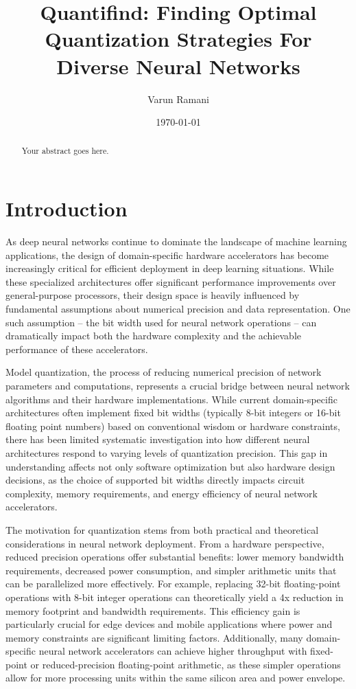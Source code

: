 \documentclass[twocolumn]{article}
\title{Quantifind: Finding Optimal Quantization Strategies For Diverse Neural Networks}
\author{Varun Ramani}
\date{\today}
\begin{document}
\maketitle

\begin{abstract}
Your abstract goes here.
\end{abstract}

\section{Introduction}
As deep neural networks continue to dominate the landscape of machine learning
applications, the design of domain-specific hardware accelerators has become
increasingly critical for efficient deployment in deep learning situations.
While these specialized architectures offer significant performance improvements
over general-purpose processors, their design space is heavily influenced by
fundamental assumptions about numerical precision and data representation. One
such assumption -- the bit width used for neural network operations -- can
dramatically impact both the hardware complexity and the achievable performance
of these accelerators.

Model quantization, the process of reducing numerical precision of network
parameters and computations, represents a crucial bridge between neural network
algorithms and their hardware implementations. While current domain-specific
architectures often implement fixed bit widths (typically 8-bit integers or
16-bit floating point numbers) based on conventional wisdom or hardware
constraints, there has been limited systematic investigation into how different
neural architectures respond to varying levels of quantization precision. This
gap in understanding affects not only software optimization but also hardware
design decisions, as the choice of supported bit widths directly impacts circuit
complexity, memory requirements, and energy efficiency of neural network
accelerators.

The motivation for quantization stems from both practical and theoretical
considerations in neural network deployment. From a hardware perspective,
reduced precision operations offer substantial benefits: lower memory bandwidth
requirements, decreased power consumption, and simpler arithmetic units that can
be parallelized more effectively. For example, replacing 32-bit floating-point
operations with 8-bit integer operations can theoretically yield a 4x reduction
in memory footprint and bandwidth requirements. This efficiency gain is
particularly crucial for edge devices and mobile applications where power and
memory constraints are significant limiting factors. Additionally, many
domain-specific neural network accelerators can achieve higher throughput with
fixed-point or reduced-precision floating-point arithmetic, as these simpler
operations allow for more processing units within the same silicon area and
power envelope.
\end{document}
